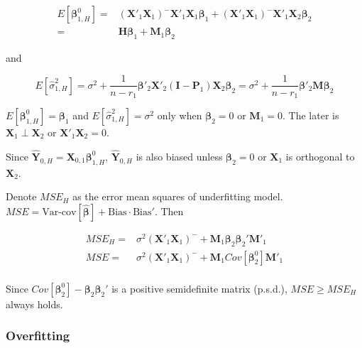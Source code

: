 \documentclass[
  11pt,
  openany]{memoir}
\begin{document}
\begin{equation}
\begin{split}
E[\boldsymbol\beta^0_{1,H}]=&(\mathbf{X}'_1\mathbf{X}_1)^{-}\mathbf{X}'_1\mathbf{X}_1\boldsymbol\beta_1+(\mathbf{X}'_1\mathbf{X}_1)^{-}\mathbf{X}'_1\mathbf{X}_2\boldsymbol\beta_2\\
=&\mathbf{H}\boldsymbol\beta_1+\mathbf{M}_1\boldsymbol\beta_2
\end{split}
\end{equation}

and

\begin{equation}
E[\hat\sigma^2_{1,H}]=\sigma^2 + \frac{1}{n-r_1}\boldsymbol\beta'_2\mathbf{X}'_2(\mathbf{I}-\mathbf{P}_1)\mathbf{X}_2\boldsymbol\beta_2
=\sigma^2 + \frac{1}{n-r_1}\boldsymbol\beta'_2\mathbf{M}\boldsymbol\beta_2
\end{equation}

\(E[\boldsymbol\beta^0_{1,H}]=\boldsymbol\beta_1\) and \(E[\hat\sigma^2_{1,H}]=\sigma^2\) only when \(\boldsymbol\beta_2=0\) or \(\mathbf{M}_1=0\). The later is \(\mathbf{X}_1\perp\mathbf{X}_2\) or \(\mathbf{X}'_1\mathbf{X}_2=0\).

Since \(\mathbf{\hat Y}_{0,H}=\mathbf{X}_{0,1}\boldsymbol\beta^0_{1,H}\), \(\mathbf{\hat Y}_{0,H}\) is also biased unless \(\boldsymbol\beta_2=0\) or \(\mathbf{X}_1\) is orthogonal to \(\mathbf{X}_2\).

Denote \(MSE_{H}\) as the error mean squares of underfitting model. \(MSE=\text{Var-cov}[\boldsymbol{\hat\beta}]+\text{Bias}\cdot\text{Bias}'\). Then

\begin{equation}
\begin{split}
MSE_{H}=&\sigma^2(\mathbf{X}'_1\mathbf{X}_1)^{-} + \mathbf{M}_1\boldsymbol\beta_2\boldsymbol\beta_2'\mathbf{M}'_1\\
MSE=&\sigma^2(\mathbf{X}'_1\mathbf{X}_1)^{-} + \mathbf{M}_1Cov[\boldsymbol\beta_2^0]\mathbf{M}'_1\\
\end{split}
\end{equation}

Since \(Cov[\boldsymbol\beta_2^0]-\boldsymbol\beta_2\boldsymbol\beta_2'\) is a positive semidefinite matrix (p.s.d.), \(MSE\ge MSE_{H}\) always holds.

\hypertarget{overfitting}{%
\subsubsection{Overfitting}\label{overfitting}}
\end{document}
